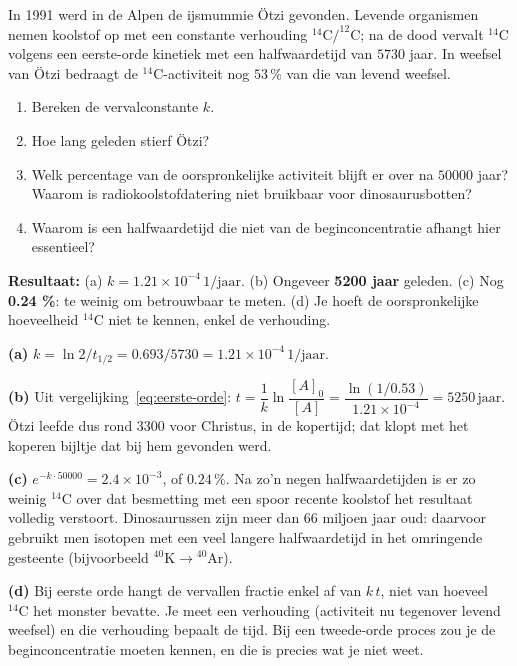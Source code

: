\begin{oefening}
In 1991 werd in de Alpen de ijsmummie Ötzi gevonden. Levende organismen nemen koolstof op met een constante verhouding \(\mathrm{^{14}C/^{12}C}\); na de dood vervalt \(\mathrm{^{14}C}\) volgens een eerste-orde kinetiek met een halfwaardetijd van \(5730\) jaar. In weefsel van Ötzi bedraagt de \(\mathrm{^{14}C}\)-activiteit nog \(53\,\%\) van die van levend weefsel.

\begin{enumerate}
\item[(a)]
  Bereken de vervalconstante \(k\).
\item[(b)]
  Hoe lang geleden stierf Ötzi?
\item[(c)]
  Welk percentage van de oorspronkelijke activiteit blijft er over na \(50000\) jaar? Waarom is radiokoolstofdatering niet bruikbaar voor dinosaurusbotten?
\item[(d)]
  Waarom is een halfwaardetijd die niet van de beginconcentratie afhangt hier essentieel?
\end{enumerate}
\end{oefening}
\begin{oplossing}
\textbf{Resultaat:} (a) \(k = 1.21\times10^{-4}\,\mathrm{1/jaar}\). (b) Ongeveer \textbf{5200 jaar} geleden. (c) Nog \textbf{0.24 \%}: te weinig om betrouwbaar te meten. (d) Je hoeft de oorspronkelijke hoeveelheid \(\mathrm{^{14}C}\) niet te kennen, enkel de verhouding.

\textbf{(a)} \(k = \ln 2/t_{1/2} = 0.693/5730 = 1.21\times10^{-4}\,\mathrm{1/jaar}\).

\textbf{(b)} Uit vergelijking~\eqref{eq:eerste-orde}: \(t = \dfrac{1}{k}\ln\dfrac{[A]_0}{[A]} = \dfrac{\ln(1/0.53)}{1.21\times10^{-4}} = 5250\,\mathrm{jaar}\). Ötzi leefde dus rond 3300 voor Christus, in de kopertijd; dat klopt met het koperen bijltje dat bij hem gevonden werd.

\textbf{(c)} \(e^{-k\cdot 50000} = 2.4\times10^{-3}\), of \(0.24\,\%\). Na zo'n negen halfwaardetijden is er zo weinig \(\mathrm{^{14}C}\) over dat besmetting met een spoor recente koolstof het resultaat volledig verstoort. Dinosaurussen zijn meer dan \(66\) miljoen jaar oud: daarvoor gebruikt men isotopen met een veel langere halfwaardetijd in het omringende gesteente (bijvoorbeeld \(\mathrm{^{40}K \rightarrow {}^{40}Ar}\)).

\textbf{(d)} Bij eerste orde hangt de vervallen fractie enkel af van \(k\,t\), niet van hoeveel \(\mathrm{^{14}C}\) het monster bevatte. Je meet een verhouding (activiteit nu tegenover levend weefsel) en die verhouding bepaalt de tijd. Bij een tweede-orde proces zou je de beginconcentratie moeten kennen, en die is precies wat je niet weet.
\end{oplossing}

